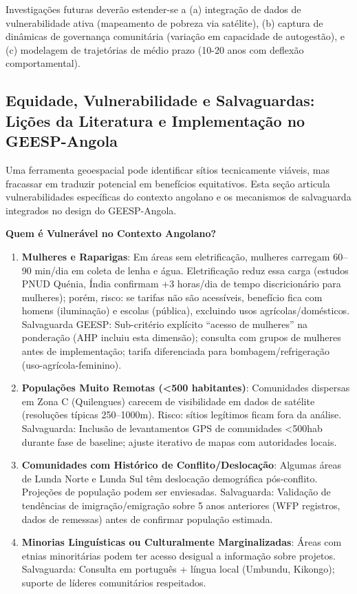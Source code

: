 \documentclass[12pt, a4paper]{article}
\begin{document}
Investigações futuras deverão estender-se a (a) integração de dados de vulnerabilidade 
ativa (mapeamento de pobreza via satélite), (b) captura de dinâmicas de governança 
comunitária (variação em capacidade de autogestão), e (c) modelagem de trajetórias 
de médio prazo (10-20 anos com deflexão comportamental).

\subsection{Equidade, Vulnerabilidade e Salvaguardas: Lições da Literatura e Implementação no GEESP-Angola}

Uma ferramenta geoespacial pode identificar sítios tecnicamente viáveis, mas fracassar em traduzir potencial em benefícios equitativos. Esta seção articula vulnerabilidades específicas do contexto angolano e os mecanismos de salvaguarda integrados no design do GEESP-Angola.

\textbf{Quem é Vulnerável no Contexto Angolano?}

\begin{enumerate}
\item \textbf{Mulheres e Raparigas}: Em áreas sem eletrificação, mulheres carregam 60--90 min/dia em coleta de lenha e água. Eletrificação reduz essa carga (estudos PNUD Quénia, Índia confirmam +3 horas/dia de tempo discricionário para mulheres); porém, risco: se tarifas não são acessíveis, benefício fica com homens (iluminação) e escolas (pública), excluindo usos agrícolas/domésticos. Salvaguarda GEESP: Sub-critério explícito ``acesso de mulheres'' na ponderação (AHP incluiu esta dimensão); consulta com grupos de mulheres antes de implementação; tarifa diferenciada para bombagem/refrigeração (uso-agrícola-feminino).

\item \textbf{Populações Muito Remotas (<500 habitantes)}: Comunidades dispersas em Zona C (Quilengues) carecem de visibilidade em dados de satélite (resoluções típicas 250--1000m). Risco: sítios legítimos ficam fora da análise. Salvaguarda: Inclusão de levantamentos GPS de comunidades <500hab durante fase de baseline; ajuste iterativo de mapas com autoridades locais.

\item \textbf{Comunidades com Histórico de Conflito/Deslocação}: Algumas áreas de Lunda Norte e Lunda Sul têm deslocação demográfica pós-conflito. Projeções de população podem ser enviesadas. Salvaguarda: Validação de tendências de imigração/emigração sobre 5 anos anteriores (WFP registros, dados de remessas) antes de confirmar população estimada.

\item \textbf{Minorias Linguísticas ou Culturalmente Marginalizadas}: Áreas com etnias minoritárias podem ter acesso desigual a informação sobre projetos. Salvaguarda: Consulta em português + língua local (Umbundu, Kikongo); suporte de líderes comunitários respeitados.
\end{enumerate}
\end{document}
